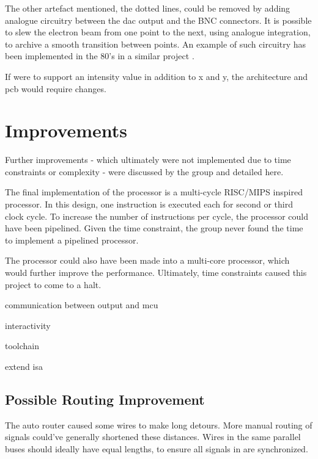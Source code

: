 The other artefact mentioned, the dotted lines, could be removed by adding analogue circuitry between the \gls{dac} output and the BNC connectors.
It is possible to slew the electron beam from one point to the next, using analogue integration, to archive a smooth transition between points.
An example of such circuitry has been implemented in the 80's in a similar project \cite{vector-graphic-crt}.

If \vthreek were to support an intensity value in addition to x and y, the architecture and \gls{pcb} would require changes.

\section{Improvements}
Further improvements - which ultimately were not implemented due to time constraints or complexity - were discussed by the group and detailed here.

The final implementation of the processor is a multi-cycle RISC/MIPS inspired processor.
In this design, one instruction is executed each for second or third clock cycle.
To increase the number of instructions per cycle, the processor could have been pipelined.
Given the time constraint, the group never found the time to implement a pipelined processor.

The processor could also have been made into a multi-core processor, which would further improve the performance. Ultimately, time constraints caused this project to come to a halt.

communication between output and mcu

interactivity

toolchain

extend isa

\subsection{Possible Routing Improvement}
The auto router caused some wires to make long detours. 
More manual routing of signals could've generally shortened these distances. 
Wires in the same parallel buses should ideally have equal lengths, to ensure all signals in are synchronized. 
